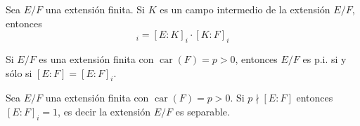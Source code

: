 \documentclass[12pt]{report}
\theoremstyle{largebreak}
\DeclareMathOperator{\car}{car}
\begin{document}
    \begin{obs}
        Sea $E/F$ una extensión finita. Si $K$ es un campo intermedio de la extensión $E/F$, entonces
        \begin{equation*}
            [E:F]_i=[E:K]_i\cdot[K:F]_i
        \end{equation*}
        
        Si $E/F$ es una extensión finita con $\car(F)=p>0$, entonces $E/F$ es p.i. si y sólo si $[E:F]=[E:F]_i$.
    \end{obs}

    \begin{obs}
        Sea $E/F$ una extensión finita con $\car(F)=p>0$. Si $p\nmid [E:F]$ entonces $[E:F]_i=1$, es decir la extensión $E/F$ es separable.
    \end{obs}
\end{document}
